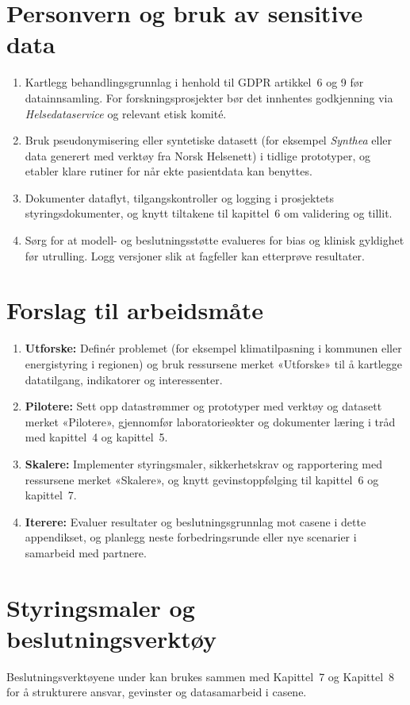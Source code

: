 \section{Personvern og bruk av sensitive data}
\begin{enumerate}
    \item Kartlegg behandlingsgrunnlag i henhold til GDPR artikkel~6 og 9 før datainnsamling. For forskningsprosjekter bør det innhentes godkjenning via \emph{Helsedataservice} og relevant etisk komité.
    \item Bruk pseudonymisering eller syntetiske datasett (for eksempel \emph{Synthea} eller data generert med verktøy fra Norsk Helsenett) i tidlige prototyper, og etabler klare rutiner for når ekte pasientdata kan benyttes.
    \item Dokumenter dataflyt, tilgangskontroller og logging i prosjektets styringsdokumenter, og knytt tiltakene til kapittel~6 om validering og tillit.
    \item Sørg for at modell- og beslutningsstøtte evalueres for bias og klinisk gyldighet før utrulling. Logg versjoner slik at fagfeller kan etterprøve resultater.
\end{enumerate}

\section{Forslag til arbeidsmåte}
\begin{enumerate}
    \item \textbf{Utforske:} Definér problemet (for eksempel klimatilpasning i kommunen eller energistyring i regionen) og bruk ressursene merket «Utforske» til å kartlegge datatilgang, indikatorer og interessenter.
    \item \textbf{Pilotere:} Sett opp datastrømmer og prototyper med verktøy og datasett merket «Pilotere», gjennomfør laboratorieøkter og dokumenter læring i tråd med kapittel~4 og kapittel~5.
    \item \textbf{Skalere:} Implementer styringsmaler, sikkerhetskrav og rapportering med ressursene merket «Skalere», og knytt gevinstoppfølging til kapittel~6 og kapittel~7.
    \item \textbf{Iterere:} Evaluer resultater og beslutningsgrunnlag mot casene i dette appendikset, og planlegg neste forbedringsrunde eller nye scenarier i samarbeid med partnere.
\end{enumerate}

\section{Styringsmaler og beslutningsverktøy}
Beslutningsverktøyene under kan brukes sammen med Kapittel~7 og Kapittel~8 for å strukturere ansvar, gevinster og datasamarbeid i casene.

